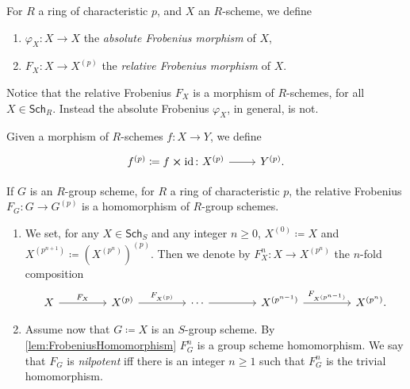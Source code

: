 \begin{defn}
	For $R$ a ring of characteristic $p$, and $X$ an $R$-scheme, we define
\begin{enumerate}
	\item $\varphi_X\colon X \to X$ the {\em absolute Frobenius morphism} of $X$,
	\item $F_X \colon X \to X^{(p)}$ the {\em relative Frobenius morphism} of $X$.
\end{enumerate}
\end{defn}


\begin{rem}[]
	Notice that the relative Frobenius $F_X$ is a
	morphism of $R$-schemes, for all $X \in \mathsf{Sch}_{ R }$.
	Instead the absolute Frobenius $\varphi_X$, in general, is not.
\end{rem}


\begin{ntt}
	Given a morphism of $R$-schemes $f\colon X \to Y$,
	we define 
	\begin{equation}
	\begin{tikzcd}[row sep = 0ex
		,/tikz/column 1/.append style={anchor=base east}
		,/tikz/column 2/.append style={anchor=base west}]
		f^{(p)} \coloneqq f \cross \mathrm{id}_{  }\colon X^{(p)} \arrow[r, "", rightarrow] &
		Y^{(p)}
	.\end{tikzcd}
	\end{equation} 
\end{ntt}


\begin{lem}\label{lem:FrobeniusHomomorphism}
	If $G$ is an $R$-group scheme, for $R$ a ring of characteristic $p$,
	the relative Frobenius $F_G\colon G \to G^{(p)}$ is a 
	homomorphism of $R$-group schemes.
\end{lem} 


\begin{defn}\leavevmode\vspace{-1.2\baselineskip}\label{defn:nilpotentFrobenius}
\begin{enumerate}
\item We set, for any $X \in \mathsf{Sch}_{ S }$ and any integer $n \geq 0$,
	$X^{(0)} \coloneqq X$ and $X^{(p^{n+1})} \coloneqq \left( X^{(p^{n})} \right)^{(p)}$.
	Then we denote by $F^n_X\colon X \to X^{(p^n)}$
	the $n$-fold composition
	\begin{equation}
	\begin{tikzcd}[column sep=4.3em]
		X \arrow[r, "F_X", rightarrow] &
		X^{(p)} \arrow[r, "F_{X^{(p)}}", rightarrow] &
		\cdots \arrow[r, "", rightarrow] &
		X^{(p^{n-1})} \arrow[r, "F_{X^{(p^{n-1})}}", rightarrow] &
		X^{(p^n)}
	.\end{tikzcd}
	\end{equation}
\item Assume now that $G \coloneqq X$ is an $S$-group scheme. 
	By \cref{lem:FrobeniusHomomorphism} $F^n_G$ is a group scheme homomorphism.
	We say that $F_G$ is {\em nilpotent} iff there is an integer $n \geq 1$ such that
	$F^n_G$ is the trivial homomorphism.
\end{enumerate}
\end{defn}


